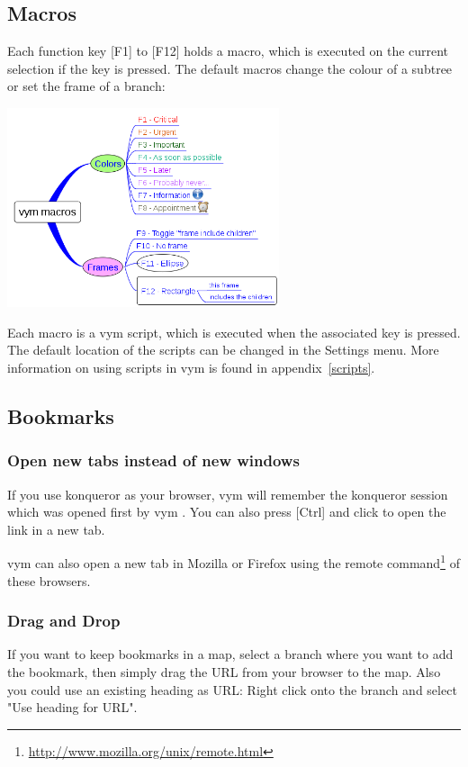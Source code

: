 \documentclass[12pt,a4paper]{article}
\newcommand{\vym}{{\sc vym }}
\newcommand{\key}[1]{[#1]}
\begin{document}
\subsection{Macros} \label{macros}
Each function key
\key{F1} to \key{F12} holds a macro, which is executed on the current
selection if the key is pressed. The default macros change the colour of
a subtree or set the frame of a branch:
\begin{center}
    \includegraphics[width=8cm]{images/macros.png}
\end{center}
Each macro is a \vym script, which is executed when the associated key
is pressed. The default location of the scripts can be changed in the
Settings menu. More information on using scripts in \vym is found in
appendix~\ref{scripts}.

\subsection{Bookmarks} \label{bookmarks}
\subsubsection*{Open new tabs instead of new windows}
If you use konqueror as your browser, \vym will remember the konqueror session which
was opened first by \vym. You can also press \key{Ctrl} and click to
open the link in a new tab.

\vym can also open a new tab in Mozilla or Firefox using the remote
command\footnote{
    \href{http://www.mozilla.org/unix/remote.html}{http://www.mozilla.org/unix/remote.html}}
of these browsers.

\subsubsection*{Drag and Drop}
If you want to keep bookmarks in a map, select a branch where you want
to add the bookmark, then simply drag the URL from your browser to the
map. Also you could use an existing heading as URL: Right click onto the
branch and select "Use heading for URL".
\end{document}
